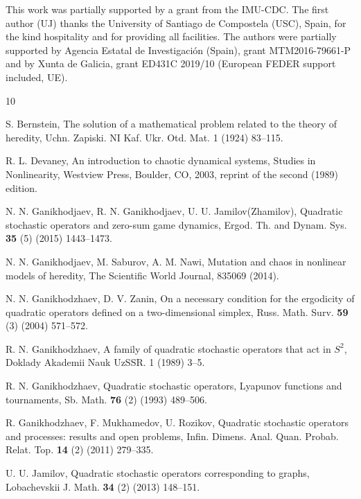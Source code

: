 \documentclass[11pt,reqno]{amsart}
\numberwithin{equation}{section} \setcounter{tocdepth}{1}
\begin{document}
This work was partially supported by a grant from the IMU-CDC.
The first author (UJ) thanks the University of Santiago de Compostela (USC), Spain,  for the kind hospitality and for  providing all facilities.
The authors were partially supported by Agencia Estatal de Investigaci\'on (Spain), grant MTM2016-79661-P and by Xunta
de Galicia, grant ED431C 2019/10 (European FEDER support included, UE).
%
%

\begin{thebibliography}{10}


 S. Bernstein, The solution of a mathematical problem related to the theory of heredity, Uchn.
Zapiski. NI Kaf. Ukr. Otd. Mat. 1 (1924) 83--115.

 R. L. Devaney, An introduction to chaotic dynamical systems, Studies in Nonlinearity, Westview
Press, Boulder, CO, 2003, reprint of the second (1989) edition.

 N. N. Ganikhodjaev, R. N. Ganikhodjaev, U. U. Jamilov(Zhamilov), Quadratic stochastic operators
and zero-sum game dynamics, Ergod. Th. and Dynam. Sys. {\bf 35} (5) (2015) 1443--1473.

 N. N. Ganikhodjaev, M. Saburov, A. M. Nawi, Mutation and chaos in nonlinear models of heredity,
The Scientific World Journal, 835069 (2014).

 N. N. Ganikhodzhaev, D. V. Zanin, On a necessary condition for the ergodicity of quadratic operators
defined on a two-dimensional simplex, Russ. Math. Surv. {\bf 59} (3) (2004) 571--572.

 R. N. Ganikhodzhaev, A family of quadratic stochastic operators that act in $S^2$, Doklady Akademii
Nauk UzSSR. 1 (1989) 3--5.

 R. N. Ganikhodzhaev, Quadratic stochastic operators, Lyapunov functions and tournaments, Sb.
Math. {\bf 76} (2) (1993) 489--506.

R. Ganikhodzhaev, F. Mukhamedov, U. Rozikov, Quadratic stochastic operators and processes:
results and open problems, Infin. Dimens. Anal. Quan. Probab. Relat. Top. {\bf 14} (2) (2011) 279--335.

 U. U. Jamilov, Quadratic stochastic operators corresponding to graphs,
 Lobachevskii J. Math. {\bf 34} (2) (2013) 148--151.


\end{thebibliography}
\end{document}
